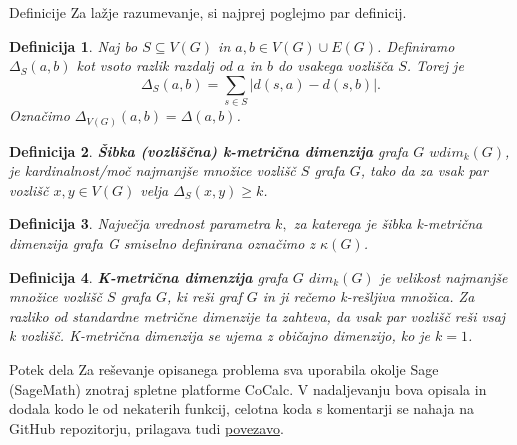\documentclass[12pt,a4paper]{amsart}
\makeatletter
\renewcommand\section{\@startsection{section}{1}%
  \z@{.5\linespacing\@plus.7\linespacing}{.5\linespacing}%
  {\normalfont\scshape\large\centering}}
\theoremstyle{plain} %
\newtheorem{definition}{Definicija}[section]
\makeatother
\begin{document}
\section{Definicije}
Za lažje razumevanje, si najprej poglejmo par definicij.
\begin{definition}
    Naj bo $S \subseteq V(G)$ in $a, b \in V(G) \cup E(G)$. Definiramo $\Delta_S (a,b)$ kot vsoto razlik razdalj od $a$ in $b$ do vsakega vozlišča $S$. 
    Torej je $$\Delta_S (a,b) = \sum_{s \in S } |d(s,a) - d(s,b)|.$$
    Označimo $\Delta_{V(G)} (a,b) = \Delta (a,b)$.
\end{definition}

\begin{definition} 
    {\bf Šibka (vozliščna) k-metrična dimenzija} grafa $G$ $wdim_k(G)$, je kardinalnost/moč
    najmanjše množice vozlišč $S$ grafa $G$, tako da za vsak par vozlišč $x,y \in V(G)$ velja $\Delta_S (x,y) \geq k$.
\end{definition}

\begin{definition}
    Največja vrednost parametra $k,$ za katerega je šibka k-metrična dimenzija grafa G smiselno definirana označimo z $\kappa(G)$. 
\end{definition}

\begin{definition}
    {\bf K-metrična dimenzija} grafa $G$ $dim_k(G)$ je velikost najmanjše množice vozlišč $S$ grafa $G$, ki reši graf $G$ in ji rečemo k-rešljiva množica. 
    Za razliko od standardne metrične dimenzije ta zahteva, da vsak par vozlišč reši vsaj k vozlišč. K-metrična dimenzija se ujema z običajno dimenzijo, ko je $k = 1$.
\end{definition}
\bigskip
\section{Potek dela}
Za reševanje opisanega problema sva uporabila okolje Sage (SageMath) znotraj spletne platforme CoCalc. 
V nadaljevanju bova opisala in dodala kodo le od nekaterih funkcij, celotna koda s komentarji
se nahaja na GitHub repozitorju, prilagava tudi \href{https://github.com/mihajan/Weak-k-Metric-Dimension}{povezavo}.
\bigskip

\end{document}
